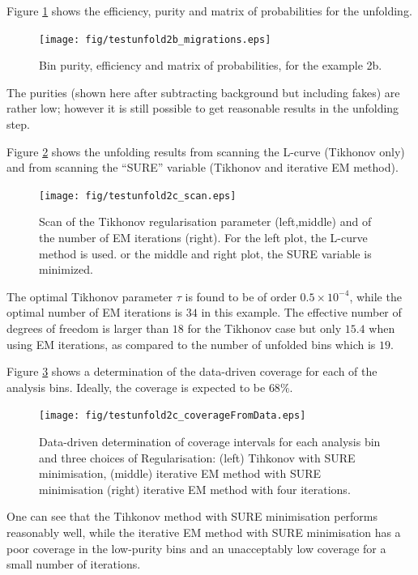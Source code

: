 \documentclass[12pt]{article}
\begin{document}
Figure \ref{fig:2b_migrations} shows the efficiency, purity and
matrix of probabilities for the unfolding.
\begin{figure}
\begin{center}
\texttt{[image: fig/testunfold2b\_migrations.eps]}
\end{center}
\caption{\label{fig:2b_migrations} Bin purity, efficiency and
  matrix of probabilities, for the example 2b.}
\end{figure}
The purities (shown here after subtracting background but including
fakes) are rather low; however it is still possible to get reasonable
results in the unfolding step.

Figure \ref{fig:2c_scan} shows the unfolding results from scanning the
L-curve (Tikhonov only) and from scanning the ``SURE'' variable
(Tikhonov and iterative EM method).
\begin{figure}
\begin{center}
\texttt{[image: fig/testunfold2c\_scan.eps]}
\end{center}
\caption{\label{fig:2c_scan} Scan of the Tikhonov
  regularisation parameter (left,middle) and of the number of EM
  iterations (right). For the left plot, the L-curve method is
  used. or the middle and right plot, the SURE variable is minimized.
}
\end{figure}
The optimal Tikhonov parameter $\tau$ is found to be of order $0.5\times10^{-4}$,
while the optimal number of EM iterations is $34$ in this example. The
effective number of degrees of freedom is larger than $18$ for the
Tikhonov case but only $15.4$ when using EM iterations, as compared to
the number of unfolded bins which is $19$.

Figure \ref{fig:2c_coverage} shows a determination of the data-driven
coverage for each of the analysis bins. Ideally, the coverage is
expected to be $68\%$.
\begin{figure}
\begin{center}
\texttt{[image: fig/testunfold2c\_coverageFromData.eps]}
\end{center}
\caption{\label{fig:2c_coverage} Data-driven determination of coverage
  intervals for each analysis bin and three choices of Regularisation:
  (left) Tihkonov with SURE minimisation, (middle) iterative EM method
  with SURE minimisation (right) iterative EM method with four iterations.
}
\end{figure}
One can see that the Tihkonov method with SURE minimisation performs
reasonably well, while the iterative EM method with SURE minimisation
has a poor coverage in the low-purity bins and an unacceptably low 
coverage for a small number of iterations.
\end{document}
